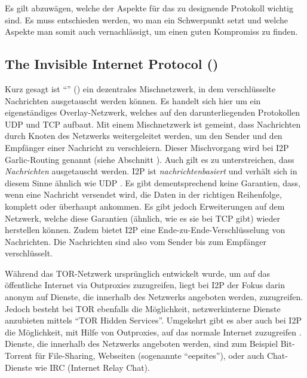 Es gilt abzuwägen, welche der Aspekte für das zu designende Protokoll wichtig sind.
Es muss entschieden werden, wo man ein Schwerpunkt setzt und welche Aspekte man somit auch vernachlässigt, um einen guten Kompromiss zu finden. \parencites[S.~1-2]{das_anonymity_2018}

\subsection{The Invisible Internet Protocol () }

Kurz gesagt ist ``'' () ein dezentrales Mischnetzwerk, in dem verschlüsselte Nachrichten ausgetauscht werden können.
Es handelt sich hier um ein eigenständiges Overlay-Netzwerk, welches auf den darunterliegenden Protokollen UDP und TCP aufbaut.
Mit einem Mischnetzwerk ist gemeint, dass Nachrichten durch Knoten des Netzwerks weitergeleitet werden, um den Sender und den Empfänger einer Nachricht zu verschleiern. Dieser Mischvorgang wird bei I2P Garlic-Routing genannt (siehe Abschnitt ).
Auch gilt es zu unterstreichen, dass \textit{Nachrichten} ausgetauscht werden.
I2P ist \textit{nachrichtenbasiert} und verhält sich in diesem Sinne ähnlich wie UDP \parencite[S.~1]{zantout_i2p_2011}.
Es gibt dementsprechend keine Garantien, dass, wenn eine Nachricht versendet wird, die Daten in der richtigen Reihenfolge, komplett oder überhaupt ankommen.
Es gibt jedoch Erweiterungen auf dem Netzwerk, welche diese Garantien (ähnlich, wie es sie bei TCP gibt) wieder herstellen können.
Zudem bietet I2P eine Ende-zu-Ende-Verschlüsselung von Nachrichten.
Die Nachrichten sind also vom Sender bis zum Empfänger verschlüsselt.

Während das TOR-Netzwerk ursprünglich entwickelt wurde, um auf das öffentliche Internet via Outproxies zuzugreifen,
liegt bei I2P der Fokus darin anonym auf Dienste, die innerhalb des Netzwerks angeboten werden, zuzugreifen.
Jedoch besteht bei TOR ebenfalls die Möglichkeit, netzwerkinterne Dienste anzubieten mittels ``TOR Hidden Services''. Umgekehrt gibt es aber auch bei I2P die Möglichkeit, mit Hilfe von Outproxies, auf das normale Internet zuzugreifen \parencite[S. 2]{ehlert_i2p_2011}.
Dienste, die innerhalb des Netzwerks angeboten werden, sind zum Beispiel Bit-Torrent für File-Sharing, Webseiten (sogenannte ``eepsites''), oder auch Chat-Dienste wie IRC (Internet Relay Chat).\\
\parencite[p.~3-4]{de_boer_invisible_2019,noauthor_i2p_nodate}


